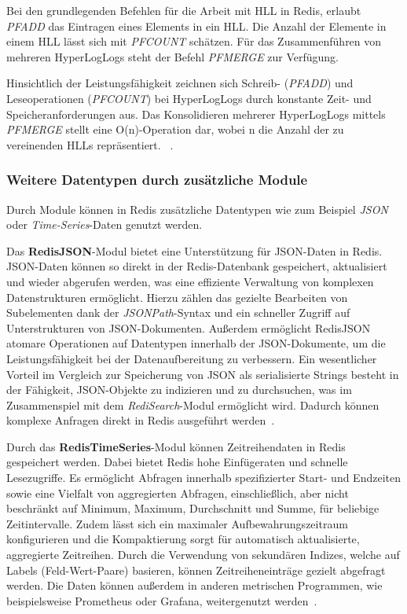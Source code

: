 Bei den grundlegenden Befehlen für die Arbeit mit \ac{HLL} in Redis, erlaubt \emph{PFADD} das Eintragen eines Elements in ein \ac{HLL}. Die Anzahl der Elemente in einem \ac{HLL} lässt sich mit \emph{PFCOUNT} schätzen. Für das Zusammenführen von mehreren HyperLogLogs steht der Befehl \emph{PFMERGE} zur Verfügung.

Hinsichtlich der Leistungsfähigkeit zeichnen sich Schreib- (\emph{PFADD}) und Leseoperationen (\emph{PFCOUNT}) bei HyperLogLogs durch konstante Zeit- und Speicheranforderungen aus. Das Konsolidieren mehrerer HyperLogLogs mittels \emph{PFMERGE} stellt eine O(n)-Operation dar, wobei n die Anzahl der zu vereinenden HLLs repräsentiert.
~\cite{redis_ltd_hyperloglog_nodate}.


\subsubsection{Weitere Datentypen durch zusätzliche Module}
Durch Module können in Redis zusätzliche Datentypen wie zum Beispiel \emph{JSON} oder \emph{Time-Series}-Daten genutzt werden.

Das \textbf{RedisJSON}-Modul bietet eine Unterstützung für JSON-Daten in Redis.
JSON-Daten können so direkt in der Redis-Datenbank gespeichert, aktualisiert und wieder abgerufen werden, was eine effiziente Verwaltung von komplexen Datenstrukturen ermöglicht. Hierzu zählen das gezielte Bearbeiten von Subelementen dank der \emph{JSONPath}-Syntax und ein schneller Zugriff auf Unterstrukturen von JSON-Dokumenten.
Außerdem ermöglicht RedisJSON atomare Operationen auf Datentypen innerhalb der JSON-Dokumente, um die Leistungsfähigkeit bei der Datenaufbereitung zu verbessern.
Ein wesentlicher Vorteil im Vergleich zur Speicherung von JSON als serialisierte Strings besteht in der Fähigkeit, JSON-Objekte zu indizieren und zu durchsuchen, was im Zusammenspiel mit dem \emph{RediSearch}-Modul ermöglicht wird.
Dadurch können komplexe Anfragen direkt in Redis ausgeführt werden~\cite{redis_ltd_json_nodate, redis_json-use-cases_nodate}.

Durch das \textbf{RedisTimeSeries}-Modul können Zeitreihendaten in Redis gespeichert werden.
Dabei bietet Redis hohe Einfügeraten und schnelle Lesezugriffe.
Es ermöglicht Abfragen innerhalb spezifizierter Start- und Endzeiten sowie eine Vielfalt von aggregierten Abfragen, einschließlich, aber nicht beschränkt auf Minimum, Maximum, Durchschnitt und Summe, für beliebige Zeitintervalle.
Zudem lässt sich ein maximaler Aufbewahrungszeitraum konfigurieren und die Kompaktierung sorgt für automatisch aktualisierte, aggregierte Zeitreihen.
Durch die Verwendung von sekundären Indizes, welche auf Labels (Feld-Wert-Paare) basieren, können Zeitreiheneinträge gezielt abgefragt werden.
Die Daten können außerdem in anderen metrischen Programmen, wie beispielsweise Prometheus oder Grafana, weitergenutzt werden~\cite{redis_ltd_time_nodate}.


